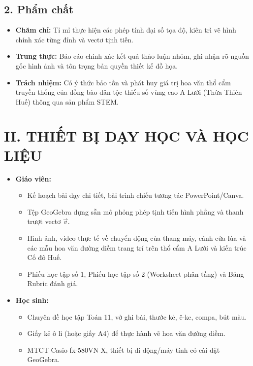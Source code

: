 \documentclass[12pt, a4paper]{article}
\renewcommand{\vec}[1]{\overrightarrow{#1}}
\begin{document}
\subsection*{2. Phẩm chất}  
\begin{itemize}[leftmargin=1.2cm]  
    \item \textbf{Chăm chỉ:} Tỉ mỉ thực hiện các phép tính đại số tọa độ, kiên trì vẽ hình chính xác từng đỉnh và vectơ tịnh tiến.  
    \item \textbf{Trung thực:} Báo cáo chính xác kết quả thảo luận nhóm, ghi nhận rõ nguồn gốc hình ảnh và tôn trọng bản quyền thiết kế đồ họa.  
    \item \textbf{Trách nhiệm:} Có ý thức bảo tồn và phát huy giá trị hoa văn thổ cẩm truyền thống của đồng bào dân tộc thiểu số vùng cao A Lưới (Thừa Thiên Huế) thông qua sản phẩm STEM.  
\end{itemize}  
  
\section*{II. THIẾT BỊ DẠY HỌC VÀ HỌC LIỆU}  
\begin{itemize}[leftmargin=1.2cm]  
    \item \textbf{Giáo viên:}  
    \begin{itemize}[leftmargin=0.6cm]  
        \item Kế hoạch bài dạy chi tiết, bài trình chiếu tương tác PowerPoint/Canva.  
        \item Tệp GeoGebra dựng sẵn mô phỏng phép tịnh tiến hình phẳng và thanh trượt vectơ $\vec{v}$.  
        \item Hình ảnh, video thực tế về chuyển động của thang máy, cánh cửa lùa và các mẫu hoa văn đường diềm trang trí trên thổ cẩm A Lưới và kiến trúc Cố đô Huế.  
        \item Phiếu học tập số 1, Phiếu học tập số 2 (Worksheet phân tầng) và Bảng Rubric đánh giá.  
    \end{itemize}  
    \item \textbf{Học sinh:}  
    \begin{itemize}[leftmargin=0.6cm]  
        \item Chuyên đề học tập Toán 11, vở ghi bài, thước kẻ, ê-ke, compa, bút màu.  
        \item Giấy kẻ ô li (hoặc giấy A4) để thực hành vẽ hoa văn đường diềm.  
        \item MTCT Casio fx-580VN X, thiết bị di động/máy tính có cài đặt GeoGebra.  
    \end{itemize}  
\end{itemize}  
  
\end{document}
